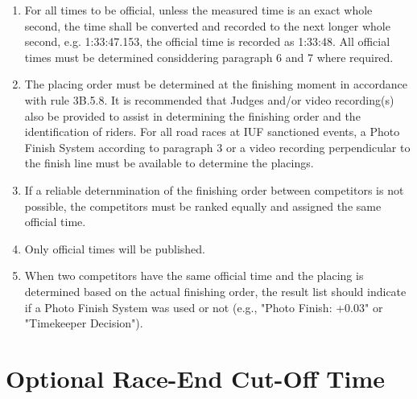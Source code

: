 \begin{enumerate}[leftmargin=1.5em,labelsep=*]
\begin{enumerate}[label=\roman*,leftmargin=2.25em,labelsep=*]
      ensures that the times are always given to at least the next longer full second.
			Unless the time is an exact full second, the time will be converted to the next longer full second.
			If the measuring system only displays full seconds and it cannot be ensured that this is the next longer full second, one second must be added to the displayed time.
			If two watches are prescribed and, after converting as indicated above and two watches are prescribed, the two watches disagree, the longer time will be official.
		\end{enumerate}
		\item For all times to be official, unless the measured time is an exact whole second, 
    the time shall be converted and recorded to the next longer whole second, e.g. 1:33:47.153, the official time is recorded as 1:33:48.
		All official times must be determined considdering paragraph 6 and 7 where required.
		\item The placing order must be determined at the finishing moment in accordance with rule 3B.5.8.
		It is recommended that Judges and/or video recording(s) also be provided to assist in determining the finishing order and the identification of riders.
		For all road races at IUF sanctioned events, a Photo Finish System according to paragraph 3 or a 
    video recording perpendicular to the finish line must be available to determine the placings.
		\item If a reliable deternmination of the finishing order between competitors is not possible, the competitors must be ranked equally and assigned the same official time.
		\item Only official times will be published.
		\item When two competitors have the same official time and the placing is determined based on the 
    actual finishing order, the result list should indicate if a Photo Finish System was used or not (e.g., "Photo Finish: +0.03" or "Timekeeper Decision").
	\end{enumerate}

\section{Optional Race-End Cut-Off Time}

